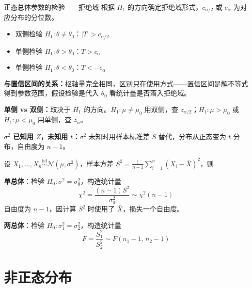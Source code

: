 \begin{definition}{正态总体参数的检验——拒绝域}
根据 $H_1$ 的方向确定拒绝域形式，$c_{\alpha/2}$ 或 $c_\alpha$ 为对应分布的分位数。
\begin{itemize}
    \item 双侧检验 $H_1: \theta \neq \theta_0$：$|T| > c_{\alpha/2}$
    \item 单侧检验 $H_1: \theta > \theta_0$：$T > c_{\alpha}$
    \item 单侧检验 $H_1: \theta < \theta_0$：$T < -c_{\alpha}$
\end{itemize}
\end{definition}
\begin{note}
\textbf{与置信区间的关系：}枢轴量完全相同，区别只在使用方式——置信区间是解不等式得到参数范围，假设检验是代入 $\theta_0$ 看统计量是否落入拒绝域。

\textbf{单侧 vs 双侧：}取决于 $H_1$ 的方向。$H_1: \mu \neq \mu_0$ 用双侧，查 $z_{\alpha/2}$；$H_1: \mu > \mu_0$ 或 $H_1: \mu < \mu_0$ 用单侧，查 $z_\alpha$。

\textbf{$\sigma^2$ 已知用 $Z$，未知用 $t$：}$\sigma^2$ 未知时用样本标准差 $S$ 替代，分布从正态变为 $t$ 分布，自由度为 $n-1$。
\end{note}
\begin{theorem}[正态总体方差检验]
设 $X_1, \ldots, X_n \overset{\text{iid}}{\sim} \mathcal{N}(\mu, \sigma^2)$，样本方差 $S^2 = \frac{1}{n-1}\sum_{i=1}^n (X_i - \bar{X})^2$，则

\textbf{单总体}：检验 $H_0: \sigma^2 = \sigma_0^2$，构造统计量
$$\chi^2 = \frac{(n-1)S^2}{\sigma_0^2} \sim \chi^2(n-1)$$
自由度为 $n-1$，因计算 $S^2$ 时使用了 $\bar{X}$，损失一个自由度。

\textbf{两总体}：检验 $H_0: \sigma_1^2 = \sigma_2^2$，构造统计量
$$F = \frac{S_1^2}{S_2^2} \sim F(n_1-1,\, n_2-1)$$
\end{theorem}
\section{非正态分布}


